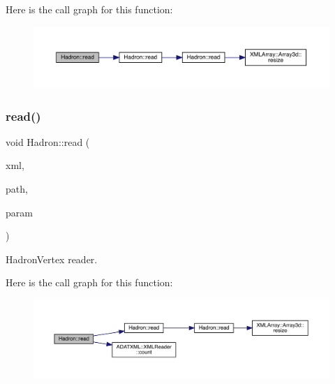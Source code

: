 Here is the call graph for this function\+:\nopagebreak
\begin{figure}[H]
\begin{center}
\leavevmode
\includegraphics[width=350pt]{d1/daf/namespaceHadron_a9a69bb90cd1c62da66808573864f7cd1_cgraph}
\end{center}
\end{figure}
\mbox{\label{namespaceHadron_a83c06845cd19520623de3b0074b9d25c}} 
\subsubsection{\texorpdfstring{read()}{read()}\hspace{0.1cm}{\footnotesize\ttfamily [40/94]}}
{\footnotesize\ttfamily void Hadron\+::read (\begin{DoxyParamCaption}\item[{\mbox{\hyperlink{classADATXML_1_1XMLReader}{X\+M\+L\+Reader}} \&}]{xml,  }\item[{const std\+::string \&}]{path,  }\item[{\mbox{\hyperlink{structHadron_1_1HadronVertex__t}{Hadron\+Vertex\+\_\+t}} \&}]{param }\end{DoxyParamCaption})}



Hadron\+Vertex reader. 

Here is the call graph for this function\+:\nopagebreak
\begin{figure}[H]
\begin{center}
\leavevmode
\includegraphics[width=350pt]{d1/daf/namespaceHadron_a83c06845cd19520623de3b0074b9d25c_cgraph}
\end{center}
\end{figure}
\mbox{\label{namespaceHadron_a10d99bb52996f8aec8a87612e98d5684}} 
